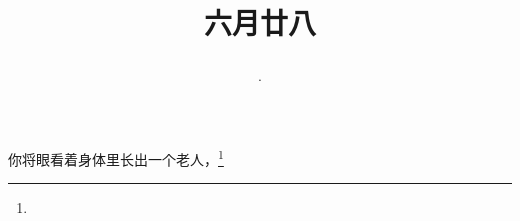 \title{\date[d=2,m=8,y=2024][year:cn-y,年,month:cn,day:cn,日,·,weekday]·六月廿八 }
你将眼看着身体里长出一个老人，\footnote{ }


